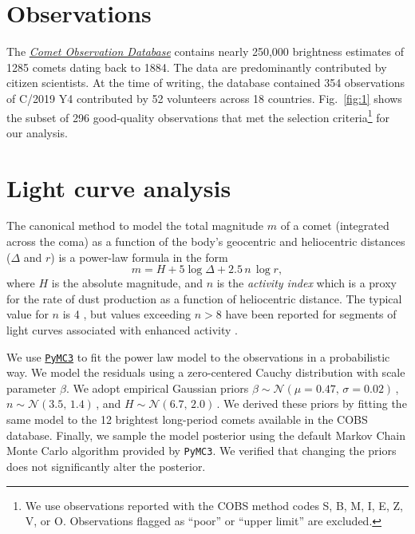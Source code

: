 \documentclass[RNAAS]{aastex63}
\begin{document}
\section{Observations}

The 
\textit{\href{https://cobs.si}{Comet Observation Database}} \citep[COBS;][]{2018JBAA..128..279Z} contains nearly 250,000 brightness estimates of 1285 comets dating back to 1884. The data are predominantly contributed by citizen scientists.
At the time of writing, the database contained 354 observations of C/2019 Y4 contributed by 52 volunteers across 18 countries.
Fig.~\ref{fig:1} shows the subset of 296 good-quality observations that met the selection criteria\footnote{We use observations reported with the COBS method codes S, B, M, I, E, Z, V, or O. Observations flagged as ``poor'' or ``upper limit'' are excluded.} for our analysis.


\section{Light curve analysis}

The canonical method to model the total magnitude $m$ of a comet (integrated across the coma) as a function of the body's geocentric and heliocentric distances ($\Delta$ and $r$) is a power-law formula in the form
\begin{equation}
m = H + 5 \log{\Delta} + 2.5\,n\,\log{r},
\end{equation}
where $H$ is the absolute magnitude, and $n$ is the \textit{activity index} which is a proxy for the rate of dust production as a function of heliocentric distance. The typical value for $n$ is 4 \citep[][]{2001A&G....42a..11G}, but values exceeding $n>8$ have been reported for segments of light curves associated with enhanced activity \citep[e.g.][]{1990acm..proc..327H}.

We use \texttt{\href{https://docs.pymc.io}{PyMC3}} \citep{pymc} to fit the power law model to the observations in a probabilistic way.
We model the residuals using a zero-centered Cauchy distribution with scale parameter $\beta$.
We adopt empirical Gaussian priors $\beta \sim \mathcal{N}(\mu=0.47,\,\sigma=0.02)\,$, 
$n \sim \mathcal{N}(3.5,\,1.4)\,$,
and
$H \sim \mathcal{N}(6.7,\,2.0)\,$.
We derived these priors by fitting the same model to the 12 brightest long-period comets available in the COBS database.
Finally, we sample the model posterior using the default Markov Chain Monte Carlo algorithm provided by \texttt{PyMC3}.  We verified that changing the priors does not significantly alter the posterior.
\end{document}

